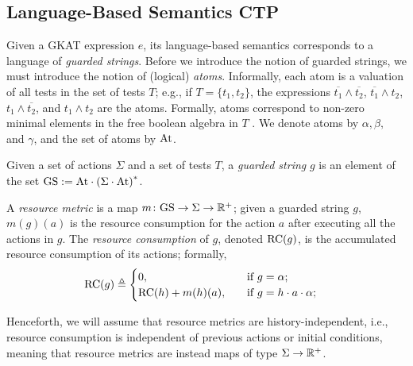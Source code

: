 \subsection{Language-Based Semantics CTP}
Given a GKAT expression $e$, its language-based semantics corresponds to a language of \emph{guarded strings}. Before we introduce the notion of guarded strings, we must introduce the notion of (logical) \emph{atoms}. Informally, each atom is a valuation of all tests in the set of tests $T$; e.g., if $T=\{t_1,t_2\}$, the expressions  $\overline{t_1}\land \overline{t_2}$, $\overline{t_1}\land {t_2}$, $t_1\land \overline{t_2}$, and $t_1\land {t_2}$ are the atoms. Formally, atoms correspond to non-zero minimal elements in the free boolean algebra in $T$ \cite{KAT}. We denote atoms by $\alpha, \beta,$ and $\gamma$, and the set of atoms by $\text{At}$.

\begin{definition}
Given a set of actions $\Sigma$ and a set of tests $T$, a \emph{guarded string} $g$ is an element of the set $\text{GS} := \text{At} \cdot \left(\Sigma\cdot \text{At}\right)^{*}$.
\end{definition}

\begin{definition}
A \emph{resource metric} is a map $m\colon \text{GS} \rightarrow \Sigma \rightarrow \mathbb{R}^{+}$; given a guarded string $g$, $m(g)(a)$ is the resource consumption for the action $a$ after executing all the actions in $g$. The \emph{resource consumption} of $g$, denoted $\text{RC}(g)$, is the accumulated resource consumption of its actions; formally,
\begin{align}
\text{RC}(g)&\triangleq 
\begin{cases}
0, &\quad \text{if $g=\alpha$;}\\
\text{RC}(h) + m(h)(a),&\quad \text{if $g=h \cdot a\cdot \alpha $;}\\
\end{cases}
\end{align}

Henceforth, we will assume that resource metrics are history-independent, i.e., resource consumption is independent of previous actions or initial conditions, meaning that resource metrics are instead maps of type $\Sigma \rightarrow \mathbb{R}^{+}$.  

\end{definition}

